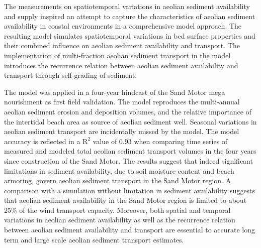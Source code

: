 The measurements on spatiotemporal variations in aeolian sediment
availability and supply inspired an attempt to capture the
characteristics of aeolian sediment availability in coastal
environments in a comprehensive model approach. The resulting model
simulates spatiotemporal variations in bed surface properties and
their combined influence on aeolian sediment availability and
transport. The implementation of multi-fraction aeolian sediment
transport in the model introduces the recurrence relation between
aeolian sediment availability and transport through self-grading of
sediment.

The model was applied in a four-year hindcast of the Sand Motor mega
nourishment as first field validation. The model reproduces the
multi-annual aeolian sediment erosion and deposition volumes, and the
relative importance of the intertidal beach area as source of aeolian
sediment well. Seasonal variations in aeolian sediment transport are
incidentally missed by the model. The model accuracy is reflected in a
$\mathrm{R^2}$ value of 0.93 when comparing time series of measured
and modeled total aeolian sediment transport volumes in the four years
since construction of the Sand Motor. The results suggest that indeed
significant limitations in sediment availability, due to soil moisture
content and beach armoring, govern aeolian sediment transport in the
Sand Motor region. A comparison with a simulation without limitation
in sediment availability suggests that aeolian sediment availability
in the Sand Motor region is limited to about 25\% of the wind
transport capacity. Moreover, both spatial and temporal variations in
aeolian sediment availability as well as the recurrence relation
between aeolian sediment availability and transport are essential to
accurate long term and large scale aeolian sediment transport
estimates.


